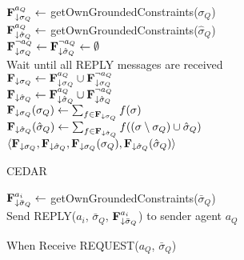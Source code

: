 \documentclass[twoside,11pt]{article}
\begin{document}
\begin{algorithm}[!t]%
\DontPrintSemicolon
{}

${\bf{F}}^{a_Q}_{\downarrow \sigma_Q} \gets$ getOwnGroundedConstraints($\sigma_Q$) \\ 
${\bf{F}}^{a_Q}_{\downarrow \hat{\sigma}_Q} \gets$ getOwnGroundedConstraints($\hat{\sigma}_Q$) \\ 
${\bf{F}}^{\lnot a_Q}_{\downarrow \sigma_Q} \gets {\bf{F}}^{\lnot a_Q}_{\downarrow \hat{\sigma}_Q} \gets \emptyset$ \\
Wait until all REPLY messages are received \\
${\bf{F}}_{\downarrow \sigma_Q} \gets {\bf{F}}^{a_Q}_{\downarrow \sigma_Q} \cup {\bf{F}}^{\lnot a_Q}_{\downarrow \sigma_Q}$ \\
${\bf{F}}_{\downarrow \hat{\sigma}_Q} \gets {\bf{F}}^{a_Q}_{\downarrow \hat{\sigma}_Q} \cup {\bf{F}}^{\lnot a_Q}_{\downarrow \hat{\sigma}_Q}$ \\
${\bf{F}}_{\downarrow \sigma_Q}(\sigma_Q) \gets \sum_{f \in {\bf{F}}_{\downarrow \sigma_Q}} f(\sigma)$ \\
${\bf{F}}_{\downarrow \hat{\sigma}_Q}(\hat{\sigma}_Q) \gets \sum_{f \in {\bf{F}}_{\downarrow \hat{\sigma}_Q}} f((\sigma \setminus \sigma_Q) \cup \hat{\sigma}_Q)$ \\
\Return $\langle {\bf{F}}_{\downarrow \sigma_Q}, {\bf{F}}_{\downarrow \hat{\sigma}_Q}, {\bf{F}}_{\downarrow \sigma_Q}(\sigma_Q), {\bf{F}}_{\downarrow \hat{\sigma}_Q}(\hat{\sigma}_Q) \rangle$

\caption{CEDAR}
\label{alg}
\end{algorithm}

\begin{procedure}[!t]%
\DontPrintSemicolon

${\bf{F}}^{a_i}_{\downarrow \bar{\sigma}_Q} \gets$ getOwnGroundedConstraints($\bar{\sigma}_Q$) \\
Send REPLY($a_i$, $\bar{\sigma}_Q$, ${\bf{F}}^{a_i}_{\downarrow \bar{\sigma}_Q}$) to sender agent $a_Q$

\caption{When Receive REQUEST($a_Q$, $\bar{\sigma}_Q$)}
\end{procedure}
\end{document}
